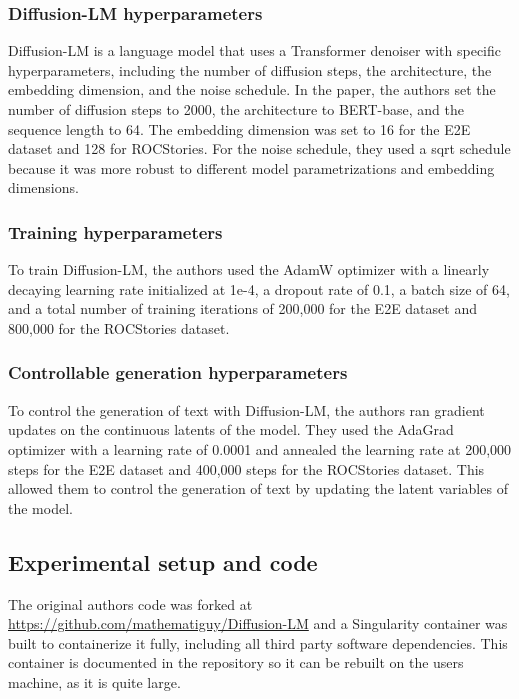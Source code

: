 \subsubsection{Diffusion-LM hyperparameters}
Diffusion-LM is a language model that uses a Transformer denoiser with specific hyperparameters, including the number of diffusion steps, the architecture, the embedding dimension, and the noise schedule. In the paper, the authors set the number of diffusion steps to 2000, the architecture to BERT-base, and the sequence length to 64. The embedding dimension was set to 16 for the E2E dataset and 128 for ROCStories. For the noise schedule, they used a sqrt schedule because it was more robust to different model parametrizations and embedding dimensions.

\subsubsection{Training hyperparameters}
To train Diffusion-LM, the authors used the AdamW optimizer with a linearly decaying learning rate initialized at 1e-4, a dropout rate of 0.1, a batch size of 64, and a total number of training iterations of 200,000 for the E2E dataset and 800,000 for the ROCStories dataset.

\subsubsection{Controllable generation hyperparameters}

To control the generation of text with Diffusion-LM, the authors ran gradient updates on the continuous latents of the model. They used the AdaGrad optimizer with a learning rate of 0.0001 and annealed the learning rate at 200,000 steps for the E2E dataset and 400,000 steps for the ROCStories dataset. This allowed them to control the generation of text by updating the latent variables of the model.

\subsection{Experimental setup and code}


The original authors code was forked at \href{https://github.com/mathematiguy/Diffusion-LM}{https://github.com/mathematiguy/Diffusion-LM} and a Singularity container was built to containerize it fully, including all third party software dependencies. This container is documented in the repository so it can be rebuilt on the users machine, as it is quite large.

